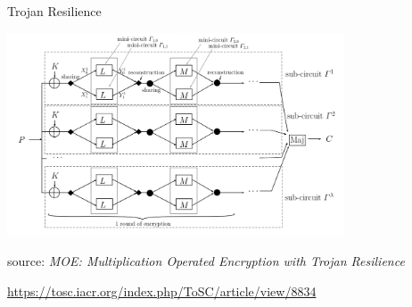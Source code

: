 \documentclass[presentation,aspectratio=1610]{beamer}
\begin{document}
\begin{frame}{Trojan Resilience}
    \begin{center}
    \includegraphics[width=10cm]{./figures/moe}

    {\small source: \emph{MOE: Multiplication Operated Encryption with Trojan Resilience}

      \url{https://tosc.iacr.org/index.php/ToSC/article/view/8834}}
  \end{center}
\end{frame}
\end{document}
